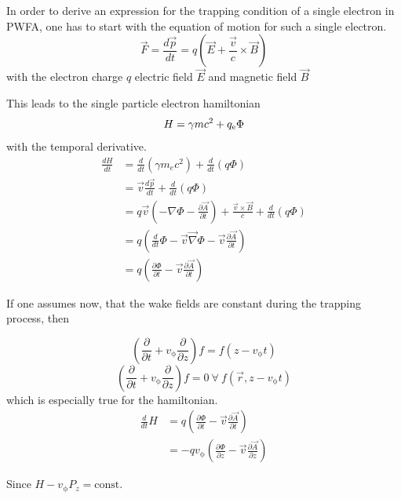 In order to derive an expression for the trapping condition of a single electron in PWFA, one has to start with the equation of motion for such a single electron. 
\begin{equation}
\vec{F}=\frac{d\vec{p}}{dt}=q(\vec{E}+\frac{\vec{v}}{c}\times\vec{B})
\end{equation}
with the electron charge $q$ electric field $\vec{E}$ and magnetic field $\vec{B}$

This leads to the single particle electron hamiltonian 
\begin{equation}
 H=\gamma m c^2+q_\mathrm{e}\Phi
\end{equation}
 with the temporal derivative.
\begin{align}
\frac{dH}{dt}&=\frac{d}{dt} (\gamma m_e c^2)+\frac{d}{dt}(q\Phi)\\
&=\vec{v}\frac{d\vec{p}}{dt}+\frac{d}{dt}(q\Phi)\\
&=q\vec{v}(-\nabla \Phi-\frac{\partial \vec{A}}{\partial t})+\frac{\vec{v}\times\vec{B}}{c}+\frac{d}{dt}(q\Phi)\\
&=q(\frac{d}{dt}\Phi-\vec{v}\vec{\nabla}\Phi-\vec{v}\frac{\partial \vec{A}}{\partial t})\\
&=q(\frac{\partial \Phi}{\partial t}-\vec{v}\frac{\partial \vec{A}}{\partial t})
\end{align}

If one assumes now, that the wake fields are constant during the trapping process, then 

\begin{equation}
(\frac{\partial}{\partial t}+v_\mathrm{\phi} \frac{\partial}{\partial z} ) f =   f ( z-v_\mathrm{\phi} t)
\end{equation}\begin{equation}
(\frac{\partial}{\partial t}+v_\mathrm{\phi} \frac{\partial}{\partial z} ) f =0 \ \forall \   f (\vec{r}, z-v_\mathrm{\phi} t)
\end{equation}
which is especially true for the hamiltonian.
\begin{align*}
\frac{d}{dt}H&=q(\frac{\partial \Phi}{\partial t}-\vec{v}\frac{\partial \vec{A}}{\partial t})\\
&=-q v_\mathrm{\phi}(\frac{\partial \Phi}{\partial z}-\vec{v} \frac{\partial \vec{A}}{\partial z}) 
\end{align*}

Since $H-v_\mathrm{\phi}P_z=\mathrm{const.}$

